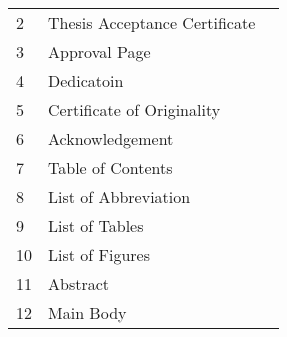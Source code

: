 \begin{table}[!ht]
\begin{adjustbox}{width=\linewidth,center}
\begin{tabular}{p{0.6cm}p{9cm}p{0.6cm}}
2              & Thesis Acceptance   Certificate                                                                                 &  \\
3              & Approval Page                                                                                                   &  \\
4              & Dedicatoin                                                                                                      &  \\
5              & Certificate of   Originality                                                                                    &  \\
6              & Acknowledgement                                                                                                 &  \\
7              & Table of Contents                                                                                               &  \\
8              & List of Abbreviation                                                                                            &  \\
9              & List of Tables                                                                                                  &  \\
10             & List of Figures                                                                                                 &  \\
11             & Abstract                                                                                                        &  \\
12             & Main Body                                                                                                       &  \\

\end{tabular}
\end{adjustbox}
\end{table}

